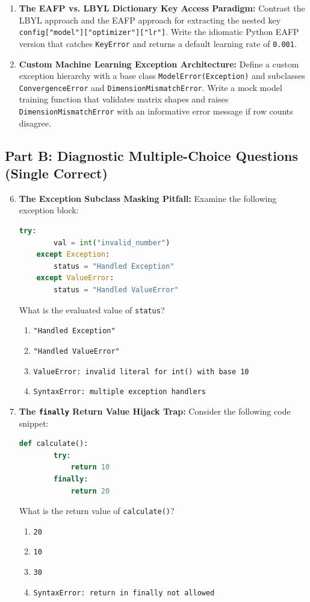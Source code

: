 \begin{enumerate}
    \item \textbf{The EAFP vs. LBYL Dictionary Key Access Paradigm:}
    Contrast the LBYL approach and the EAFP approach for extracting the nested key \texttt{config["model"]["optimizer"]["lr"]}. Write the idiomatic Python EAFP version that catches \texttt{KeyError} and returns a default learning rate of \texttt{0.001}.

    \item \textbf{Custom Machine Learning Exception Architecture:}
    Define a custom exception hierarchy with a base class \texttt{ModelError(Exception)} and subclasses \texttt{ConvergenceError} and \texttt{DimensionMismatchError}. Write a mock model training function that validates matrix shapes and raises \texttt{DimensionMismatchError} with an informative error message if row counts disagree.
\end{enumerate}

\subsection*{Part B: Diagnostic Multiple-Choice Questions (Single Correct)}

\begin{enumerate}
    \setcounter{enumi}{5}
    \item \textbf{The Exception Subclass Masking Pitfall:}
    Examine the following exception block:
    \begin{lstlisting}[language=Python]
    try:
        val = int("invalid_number")
    except Exception:
        status = "Handled Exception"
    except ValueError:
        status = "Handled ValueError"
    \end{lstlisting}
    What is the evaluated value of \texttt{status}?
    \begin{enumerate}
        \item \texttt{"Handled Exception"}
        \item \texttt{"Handled ValueError"}
        \item \texttt{ValueError: invalid literal for int() with base 10}
        \item \texttt{SyntaxError: multiple exception handlers}
    \end{enumerate}

    \item \textbf{The \texttt{finally} Return Value Hijack Trap:}
    Consider the following code snippet:
    \begin{lstlisting}[language=Python]
    def calculate():
        try:
            return 10
        finally:
            return 20
    \end{lstlisting}
    What is the return value of \texttt{calculate()}?
    \begin{enumerate}
        \item \texttt{20}
        \item \texttt{10}
        \item \texttt{30}
        \item \texttt{SyntaxError: return in finally not allowed}
    \end{enumerate}
\end{enumerate}
